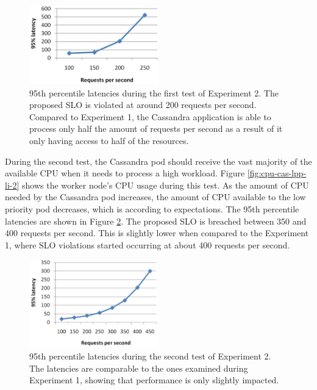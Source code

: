 \begin{figure}[h]
\centering
\includegraphics[width=0.50\textwidth]{Images/Experiments/CPU/Latencies/lat-cas-lpp-li.PNG}
\caption{95th percentile latencies during the first test of Experiment 2. The proposed SLO is violated at around 200 requests per second. Compared to Experiment 1, the Cassandra application is able to process only half the amount of requests per second as a result of it only having access to half of the resources.}
\label{fig:lat-cas-lpp-li}
\end{figure}

During the second test, the Cassandra pod should receive the vast majority of the available CPU when it needs to process a high workload. Figure \ref{fig:cpu-cas-lpp-li-2} shows the worker node's CPU usage during this test. As the amount of CPU needed by the Cassandra pod increases, the amount of CPU available to the low priority pod decreases, which is according to expectations. The 95th percentile latencies are shown in Figure \ref{fig:lat-cas-lpp-li-2}. The proposed SLO is breached between 350 and 400 requests per second. This is slightly lower when compared to the Experiment 1, where SLO violations started occurring at about 400 requests per second. \\

\begin{figure}[h]
\centering
\includegraphics[width=0.50\textwidth]{Images/Experiments/CPU/Latencies/lat-cas-lpp-li-2.PNG}
\caption{95th percentile latencies during the second test of Experiment 2. The latencies are comparable to the ones examined during Experiment 1, showing that performance is only slightly impacted.}
\label{fig:lat-cas-lpp-li-2}
\end{figure}

